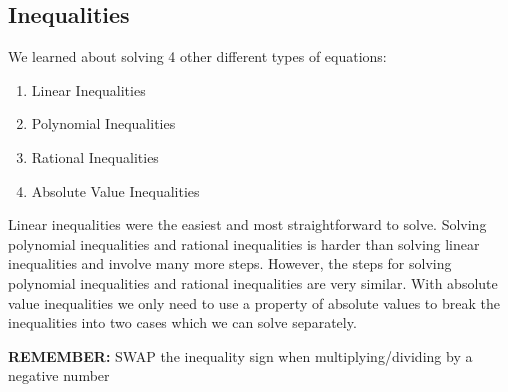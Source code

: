 \documentclass[12pt]{article}
\begin{document}
\subsection{Inequalities}

We learned about solving 4 other different types of equations:

\begin{enumerate}
\item Linear Inequalities

\item Polynomial Inequalities

\item Rational Inequalities


\item Absolute Value Inequalities

\end{enumerate}

Linear inequalities were the easiest  and most straightforward to solve. Solving polynomial inequalities and rational inequalities is harder than solving linear inequalities and involve many more steps. However, the steps for solving polynomial inequalities and rational inequalities are very similar. With absolute value inequalities we only need to use a property of absolute values to break the inequalities into two cases which we can solve separately. 

\textbf{REMEMBER:} SWAP the inequality sign when multiplying/dividing by a negative number
\end{document}
